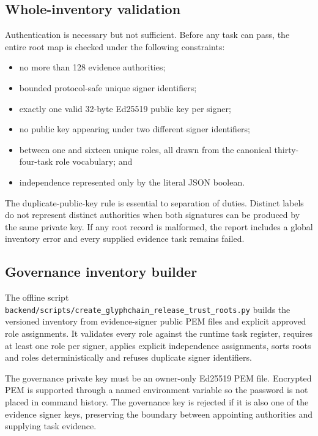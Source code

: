 \subsection{Whole-inventory validation}

Authentication is necessary but not sufficient.  Before any task can pass, the
entire root map is checked under the following constraints:

\begin{itemize}
  \item no more than 128 evidence authorities;
  \item bounded protocol-safe unique signer identifiers;
  \item exactly one valid 32-byte Ed25519 public key per signer;
  \item no public key appearing under two different signer identifiers;
  \item between one and sixteen unique roles, all drawn from the canonical
        thirty-four-task role vocabulary; and
  \item independence represented only by the literal JSON boolean.
\end{itemize}

The duplicate-public-key rule is essential to separation of duties.  Distinct
labels do not represent distinct authorities when both signatures can be produced
by the same private key.  If any root record is malformed, the report includes a
global inventory error and every supplied evidence task remains failed.

\subsection{Governance inventory builder}

The offline script
\texttt{backend/scripts/create\_glyphchain\_release\_trust\_roots.py} builds the
versioned inventory from evidence-signer public PEM files and explicit approved
role assignments.  It validates every role against the runtime task register,
requires at least one role per signer, applies explicit independence assignments,
sorts roots and roles deterministically and refuses duplicate signer identifiers.

The governance private key must be an owner-only Ed25519 PEM file.  Encrypted PEM
is supported through a named environment variable so the password is not placed in
command history.  The governance key is rejected if it is also one of the evidence
signer keys, preserving the boundary between appointing authorities and supplying
task evidence.

